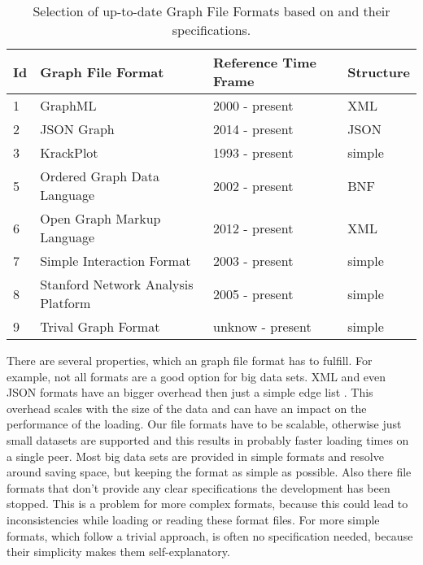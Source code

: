 \begin{table}[H]
\begin{center}
    \begin{tabular}{| l | l | l | l |}
    \hline
	\bfseries Id & \bfseries Graph File Format & \bfseries Reference Time Frame & \bfseries Structure\\ \hline
	1 & GraphML & 2000 - present & XML\\ \hline
	2 & JSON Graph & 2014 - present & JSON\\ \hline
	3 & KrackPlot & 1993 - present & simple\\ \hline
	5 & Ordered Graph Data Language & 2002 - present & BNF\\ \hline
	6 & Open Graph Markup Language & 2012 - present & XML\\ \hline
	7 & Simple Interaction Format & 2003 - present & simple\\ \hline
	8 & Stanford Network Analysis Platform & 2005 - present & simple\\ \hline
	9 & Trival Graph Format & unknow - present & simple\\ \hline
    \end{tabular}
\end{center}\caption{Selection of up-to-date Graph File Formats based on\cite{Roughan.10.03.2015} and their specifications.\newline}
\label{tabelle_avarage_time}
\end{table}
 There are several properties, which an graph file format has to fulfill. For example, not all formats are a good option for big data sets. XML and even JSON formats have an bigger overhead then just a simple edge list \cite{JSONvsXML}. This overhead scales with the size of the data and can have an impact on the performance of the loading. Our file formats have to be scalable, otherwise just small datasets are supported and this results in probably faster loading times on a single peer. Most big data sets are provided in simple formats and resolve around saving space, but keeping the format as simple as possible.
 Also there file formats that don’t provide any clear specifications the development has been stopped. This is a problem for more complex formats, because this could lead to inconsistencies while loading or reading these format files. 
 For more simple formats, which follow a trivial approach, is often no specification needed, because their simplicity makes them self-explanatory.

